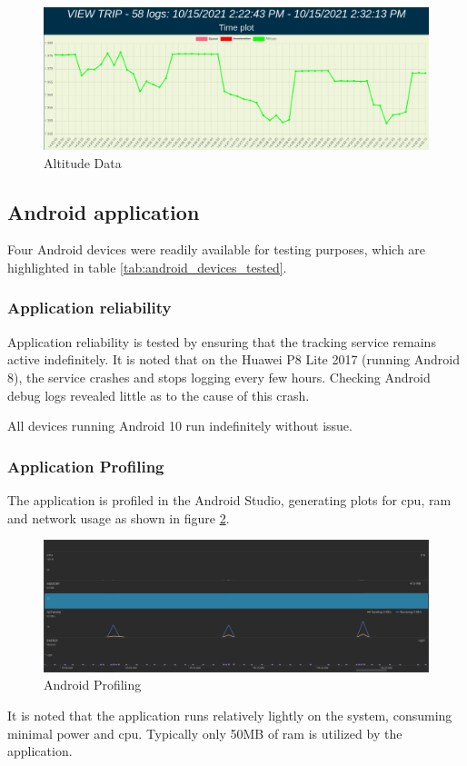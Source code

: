 \begin{figure}[H]
\centering
\includegraphics[width=5in]{eval_altitude.png}
\caption{Altitude Data}
\label{fig:eval_altitude}
\end{figure}

\subsection{Android application}
Four Android devices were readily available for testing purposes, which are highlighted in table \ref{tab:android_devices_tested}.

\subsubsection{Application reliability}
Application reliability is tested by ensuring that the tracking service remains active indefinitely.
It is noted that on the Huawei P8 Lite 2017 (running Android 8), the service crashes and stops logging every few hours.
Checking Android debug logs revealed little as to the cause of this crash.

All devices running Android 10 run indefinitely without issue.

\subsubsection{Application Profiling}
The application is profiled in the Android Studio, generating plots for \ac{cpu}, \ac{ram} and network usage as shown in figure \ref{fig:android_profiling}.
\begin{figure}[H]
\centering
\includegraphics[width=6in]{android_profiling.png}
\caption{Android Profiling}
\label{fig:android_profiling}
\end{figure}
It is noted that the application runs relatively lightly on the system, consuming minimal power and \ac{cpu}.
Typically only 50MB of \ac{ram} is utilized by the application.

